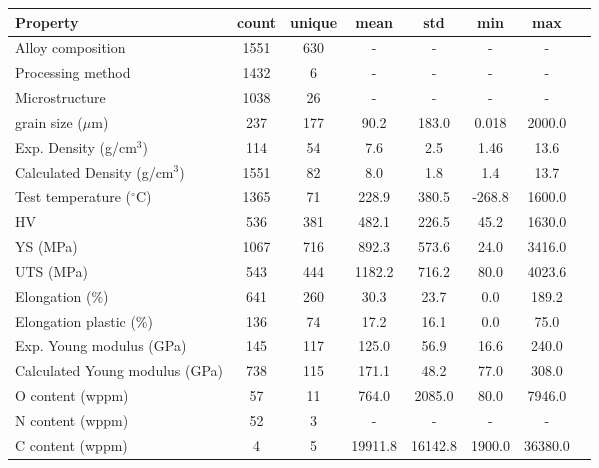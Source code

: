 \begin{tabular}{lccccccc}
\toprule
Property & count & unique & mean & std & min & max \\
\midrule
Alloy composition & 1551 & 630 & - & - & - & - \\
Processing method & 1432 & 6 & - & - & - & - \\
Microstructure & 1038 & 26 & - & - & - & - \\
grain size ($\mu$m) & 237 & 177 & 90.2 & 183.0 & 0.018 & 2000.0 \\
Exp. Density (g/cm$^3$) & 114 & 54 & 7.6 & 2.5 & 1.46 & 13.6 \\
Calculated Density (g/cm$^3$) & 1551 & 82 & 8.0 & 1.8 & 1.4 & 13.7 \\
Test temperature ($^\circ$C) & 1365 & 71 & 228.9 & 380.5 & -268.8 & 1600.0 \\
HV & 536 & 381 & 482.1 & 226.5 & 45.2 & 1630.0 \\
YS (MPa) & 1067 & 716 & 892.3 & 573.6 & 24.0 & 3416.0 \\
UTS (MPa) & 543 & 444 & 1182.2 & 716.2 & 80.0 & 4023.6 \\
Elongation (\%) & 641 & 260 & 30.3 & 23.7 & 0.0 & 189.2 \\
Elongation plastic (\%) & 136 & 74 & 17.2 & 16.1 & 0.0 & 75.0 \\
Exp. Young modulus (GPa) & 145 & 117 & 125.0 & 56.9 & 16.6 & 240.0 \\
Calculated Young modulus (GPa) & 738 & 115 & 171.1 & 48.2 & 77.0 & 308.0 \\
O content (wppm) & 57 & 11 & 764.0 & 2085.0 & 80.0 & 7946.0 \\
N content (wppm) & 52 & 3 & - & - & - & - \\
C content (wppm) & 4 & 5 & 19911.8 & 16142.8 & 1900.0 & 36380.0 \\
\bottomrule
\end{tabular}
